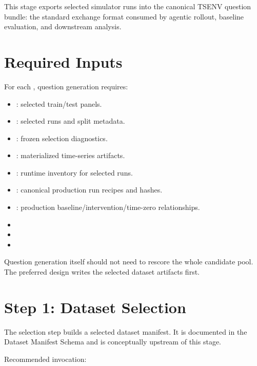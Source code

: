\documentclass[11pt]{article}
\begin{document}
\label{docstart:generate_question_stage}

This stage exports selected simulator runs into the canonical TSENV question bundle: the standard exchange format consumed by agentic rollout, baseline evaluation, and downstream analysis.

\section*{Required Inputs}

For each \termSimulator, question generation requires:

\begin{itemize}
\item {}: selected train/test panels.
\item {}: selected runs and split metadata.
\item {}: frozen selection diagnostics.
\item {}: materialized time-series artifacts.
\item {}: runtime inventory for selected runs.
\item {}: canonical production run recipes and hashes.
\item {}: production baseline/intervention/time-zero relationships.
\item {}
\item {}
\item {}
\end{itemize}

Question generation itself should not need to rescore the whole candidate pool.
The preferred design writes the selected dataset artifacts first.

\section*{Step 1: Dataset Selection}

The selection step builds a selected dataset manifest.
It is documented in the Dataset Manifest Schema and is conceptually upstream of this stage.

Recommended invocation:
\end{document}
